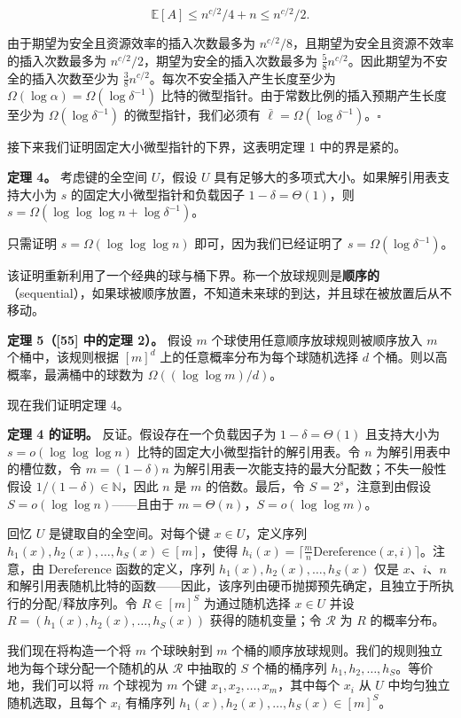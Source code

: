 \documentclass[12pt,a4paper]{ctexart}
\theoremstyle{remark}
\begin{document}
$$\mathbb{E}[A]\leq n^{c/2}/4+n\leq n^{c/2}/2.$$

由于期望为安全且资源效率的插入次数最多为 $n^{c/2}/8$，且期望为安全且资源不效率的插入次数最多为 $n^{c/2}/2$，期望为安全的插入次数最多为 $\frac{5}{8}n^{c/2}$。因此期望为不安全的插入次数至少为 $\frac{3}{8}n^{c/2}$。每次不安全插入产生长度至少为 $\Omega(\log\alpha)=\Omega(\log\delta^{-1})$ 比特的微型指针。由于常数比例的插入预期产生长度至少为 $\Omega(\log\delta^{-1})$ 的微型指针，我们必须有 $\bar{\ell}=\Omega(\log\delta^{-1})$。$\square$

接下来我们证明固定大小微型指针的下界，这表明定理 1 中的界是紧的。

\textbf{定理 4。} 考虑键的全空间 $U$，假设 $U$ 具有足够大的多项式大小。如果解引用表支持大小为 $s$ 的固定大小微型指针和负载因子 $1-\delta=\Theta(1)$，则 $s=\Omega(\log\log\log n+\log\delta^{-1})$。

只需证明 $s=\Omega(\log\log\log n)$ 即可，因为我们已经证明了 $s=\Omega(\log\delta^{-1})$。

该证明重新利用了一个经典的球与桶下界。称一个放球规则是\textbf{顺序的}（sequential），如果球被顺序放置，不知道未来球的到达，并且球在被放置后从不移动。

\textbf{定理 5（[55] 中的定理 2）。} 假设 $m$ 个球使用任意顺序放球规则被顺序放入 $m$ 个桶中，该规则根据 $[m]^d$ 上的任意概率分布为每个球随机选择 $d$ 个桶。则以高概率，最满桶中的球数为 $\Omega((\log\log m)/d)$。

现在我们证明定理 4。

\textbf{定理 4 的证明。} 反证。假设存在一个负载因子为 $1-\delta=\Theta(1)$ 且支持大小为 $s=o(\log\log\log n)$ 比特的固定大小微型指针的解引用表。令 $n$ 为解引用表中的槽位数，令 $m=(1-\delta)n$ 为解引用表一次能支持的最大分配数；不失一般性假设 $1/(1-\delta)\in\mathbb{N}$，因此 $n$ 是 $m$ 的倍数。最后，令 $S=2^s$，注意到由假设 $S=o(\log\log n)$——且由于 $m=\Theta(n)$，$S=o(\log\log m)$。

回忆 $U$ 是键取自的全空间。对每个键 $x\in U$，定义序列 $h_1(x),h_2(x),\ldots,h_S(x)\in[m]$，使得 $h_i(x)=\lceil\frac{m}{n}\text{Dereference}(x,i)\rceil$。注意，由 $\text{Dereference}$ 函数的定义，序列 $h_1(x),h_2(x),\ldots,h_S(x)$ 仅是 $x$、$i$、$n$ 和解引用表随机比特的函数——因此，该序列由硬币抛掷预先确定，且独立于所执行的分配/释放序列。令 $R\in[m]^S$ 为通过随机选择 $x\in U$ 并设 $R=(h_1(x),h_2(x),\ldots,h_S(x))$ 获得的随机变量；令 $\mathcal{R}$ 为 $R$ 的概率分布。

我们现在将构造一个将 $m$ 个球映射到 $m$ 个桶的顺序放球规则。我们的规则独立地为每个球分配一个随机的从 $\mathcal{R}$ 中抽取的 $S$ 个桶的桶序列 $h_1,h_2,\ldots,h_S$。等价地，我们可以将 $m$ 个球视为 $m$ 个键 $x_1,x_2,\ldots,x_m$，其中每个 $x_i$ 从 $U$ 中均匀独立随机选取，且每个 $x_i$ 有桶序列 $h_1(x),h_2(x),\ldots,h_S(x)\in[m]^S$。
\end{document}
